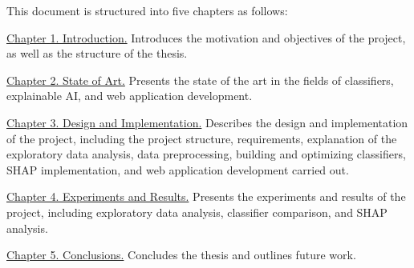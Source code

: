 This document is structured into five chapters as follows:

\hyperref[CAP:INTRODUCTION]{Chapter 1. Introduction.} Introduces the motivation and objectives of the project, as well as the structure of the thesis.

\hyperref[CAP:STATEOFTHEART]{Chapter 2. State of Art.} Presents the state of the art in the fields of classifiers, explainable AI, and web application development.

\hyperref[CAP:DESIGNIMPLEMENTATION]{Chapter 3. Design and Implementation.} Describes the design and implementation of the project, including the project structure, requirements, explanation of the exploratory data analysis, data preprocessing, building and optimizing classifiers, SHAP implementation, and web application development carried out.

\hyperref[CAP:RESULTS]{Chapter 4. Experiments and Results.} Presents the experiments and results of the project, including exploratory data analysis, classifier comparison, and SHAP analysis.

\hyperref[CAP:CONCLUSIONS]{Chapter 5. Conclusions.} Concludes the thesis and outlines future work.